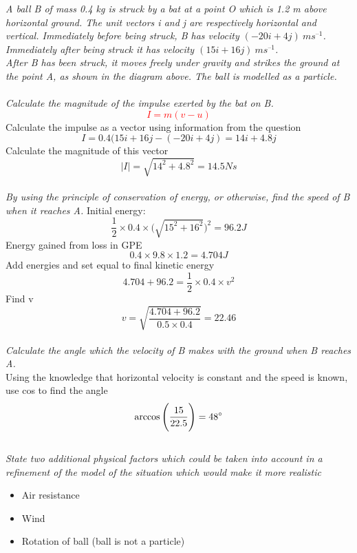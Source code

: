 \documentclass{article}[18pt]
\begin{document}
\textit{A ball B of mass 0.4 kg is struck by a bat at a point O which is 1.2 m above horizontal ground.
The unit vectors i and j are respectively horizontal and vertical. Immediately before being
struck, B has velocity $(-20i+4j) \ ms^{–1}$. Immediately after being struck it has velocity $(15i+
16j) \ ms^{–1}$.\\
After B has been struck, it moves freely under gravity and strikes the ground at the point A, as
shown in the diagram above. The ball is modelled as a particle.}\\
\\
\textit{Calculate the magnitude of the impulse exerted by the bat on B. }
\textcolor{red}{$$I=m(v-u)$$}
Calculate the impulse as a vector using information from the question
$$I=0.4(15i+16j-(-20i+4j)=14i+4.8j$$
Calculate the magnitude of this vector
$$|I|=\sqrt{14^2+4.8^2}=14.5Ns$$
\\
\textit{By using the principle of conservation of energy, or otherwise, find the speed of B when
it reaches A.}
Initial energy:
$$\frac{1}{2}\times0.4\times\Big(\sqrt{15^2+16^2}\Big)^2=96.2J$$
Energy gained from loss in GPE
$$0.4\times9.8\times1.2=4.704J$$
Add energies and set equal to final kinetic energy
$$4.704+96.2=\frac{1}{2}\times0.4\times v^2$$
Find v
$$v=\sqrt{\frac{4.704+96.2}{0.5\times0.4}}=22.46$$
\\
\textit{Calculate the angle which the velocity of B makes with the ground when B reaches A.}\\
Using the knowledge that horizontal velocity is constant and the speed is known, use cos to find the angle
$$\arccos\Bigg(\frac{15}{22.5}\Bigg)=48\degree$$
\\
\textit{State two additional physical factors which could be taken into account in a refinement of
the model of the situation which would make it more realistic}
\begin{itemize}
\item Air resistance
\item Wind
\item Rotation of ball (ball is not a particle)
\end{itemize}
\end{document}
